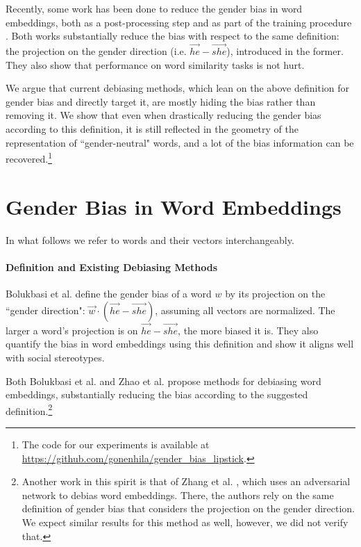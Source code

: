 \documentclass[11pt,a4paper]{article}
\begin{document}
	Recently, some work has been done to reduce the gender bias in word embeddings, both as a post-processing step \cite{BCZ16} and as part of the training procedure \cite{ZZL18}. Both works substantially reduce the bias with respect to the same definition: the projection on the gender direction (i.e. $\overrightarrow{he} - \overrightarrow{she}$), introduced in the former. They also show that performance on word similarity tasks is not hurt.
	
	We argue that current debiasing methods, which lean on the above definition for gender bias and directly target it, are mostly hiding the bias rather than removing it. We show that even when drastically reducing the gender bias according to this definition, it is still reflected in the geometry of the representation of ``gender-neutral" words, and a lot of the bias information can be recovered.\footnote{The code for our experiments is available at \url{https://github.com/gonenhila/gender_bias_lipstick}.}
	
	\section{Gender Bias in Word Embeddings}
	\label{background}
	
	In what follows we refer to words and their vectors interchangeably.
	
	\paragraph{Definition and Existing Debiasing Methods}
	
	Bolukbasi et al. \citeyearpar{BCZ16} define the gender bias of a word $w$ by its projection on the ``gender direction": $\overrightarrow{w} \cdot (\overrightarrow{he} - \overrightarrow{she})$, assuming all vectors are normalized. The larger a word's projection is on $\overrightarrow{he} - \overrightarrow{she}$, the more biased it is. They also quantify the bias in word embeddings using this definition and show it aligns well with social stereotypes. 
	
	Both Bolukbasi et al. \citeyearpar{BCZ16} and Zhao et al. \citeyearpar{ZZL18} propose methods for debiasing word embeddings, substantially reducing the bias according to the suggested definition.\footnote{Another work in this spirit is that of Zhang et al. \citeyearpar{ZLM18}, which uses an adversarial network to debias word embeddings. There, the authors rely on the same definition of gender bias that considers the projection on the gender direction. We expect similar results for this method as well, however, we did not verify that.} 
	
\end{document}
